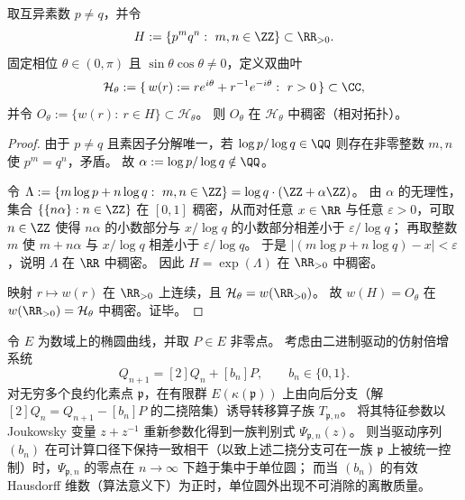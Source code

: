 \begin{proposition}[两素数尺度在双曲叶上的稠密轨道]\label{prop:conclusion-two-prime-dense-orbit-hyperbola-leaf}
取互异素数 \(p\neq q\)，并令
\[
H:=\{p^{m}q^{n}:\ m,n\in\ZZ\}\subset \RR_{>0}.
\]
固定相位 \(\theta\in(0,\pi)\) 且 \(\sin\theta\cos\theta\neq 0\)，定义双曲叶
\[
\mathcal H_{\theta}:=\{\,w(r):=r e^{i\theta}+r^{-1}e^{-i\theta}:\ r>0\,\}\subset\CC,
\]
并令 \(O_{\theta}:=\{w(r):\ r\in H\}\subset \mathcal H_{\theta}\)。
则 \(O_{\theta}\) 在 \(\mathcal H_{\theta}\) 中稠密（相对拓扑）。
\end{proposition}
\begin{proof}
由于 \(p\neq q\) 且素因子分解唯一，若 \(\log p/\log q\in\QQ\) 则存在非零整数 \(m,n\) 使 \(p^{m}=q^{n}\)，矛盾。
故 \(\alpha:=\log p/\log q\notin\QQ\)。

令
\(
\Lambda:=\{m\log p+n\log q:\ m,n\in\ZZ\}=\log q\cdot(\ZZ+\alpha\ZZ)
\)。
由 \(\alpha\) 的无理性，集合 \(\{\{n\alpha\}:n\in\ZZ\}\) 在 \([0,1]\) 稠密，从而对任意 \(x\in\RR\) 与任意 \(\varepsilon>0\)，可取 \(n\in\ZZ\) 使得 \(n\alpha\) 的小数部分与 \(x/\log q\) 的小数部分相差小于 \(\varepsilon/\log q\)；
再取整数 \(m\) 使 \(m+n\alpha\) 与 \(x/\log q\) 相差小于 \(\varepsilon/\log q\)。
于是 \(|(m\log p+n\log q)-x|<\varepsilon\)，说明 \(\Lambda\) 在 \(\RR\) 中稠密。
因此 \(H=\exp(\Lambda)\) 在 \(\RR_{>0}\) 中稠密。

映射 \(r\mapsto w(r)\) 在 \(\RR_{>0}\) 上连续，且 \(\mathcal H_{\theta}=w(\RR_{>0})\)。
故 \(w(H)=O_{\theta}\) 在 \(w(\RR_{>0})=\mathcal H_{\theta}\) 中稠密。证毕。
\end{proof}

\begin{conjecture}[椭圆倍增提升的相干零点原则]\label{conj:conclusion-elliptic-lift-coherent-zero-circle-principle}
令 \(E\) 为数域上的椭圆曲线，并取 \(P\in E\) 非零点。
考虑由二进制驱动的仿射倍增系统
\[
Q_{n+1}=[2]Q_n+[b_n]P,\qquad b_n\in\{0,1\}.
\]
对无穷多个良约化素点 \(\mathfrak p\)，在有限群 \(E(\kappa(\mathfrak p))\) 上由向后分支（解 \([2]Q_n=Q_{n+1}-[b_n]P\) 的二挠陪集）诱导转移算子族 \(T_{\mathfrak p,n}\)。
将其特征参数以 Joukowsky 变量 \(z+z^{-1}\) 重新参数化得到一族判别式 \(\Psi_{\mathfrak p,n}(z)\)。
则当驱动序列 \((b_n)\) 在可计算口径下保持一致相干（以致上述二挠分支可在一族 \(\mathfrak p\) 上被统一控制）时，\(\Psi_{\mathfrak p,n}\) 的零点在 \(n\to\infty\) 下趋于集中于单位圆；
而当 \((b_n)\) 的有效 Hausdorff 维数（算法意义下）为正时，单位圆外出现不可消除的离散质量。
\end{conjecture}

